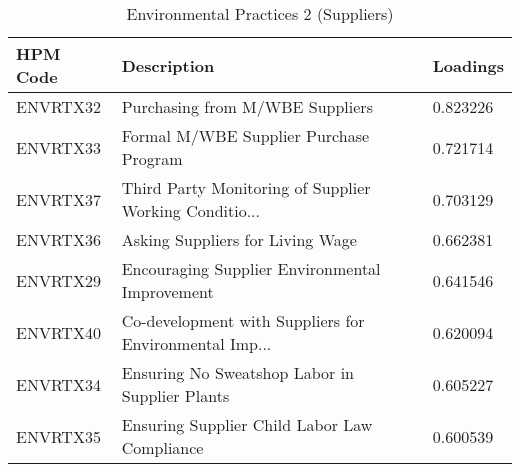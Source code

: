 \begin{table}[htbp]
\centering
\caption{Environmental Practices 2 (Suppliers)}
\label{tab:your_label}
\begin{tabular}{lll}
\toprule
HPM Code & Description & Loadings \\
\midrule
ENVRTX32 & Purchasing from M/WBE Suppliers & 0.823226 \\
ENVRTX33 & Formal M/WBE Supplier Purchase Program & 0.721714 \\
ENVRTX37 & Third Party Monitoring of Supplier Working Conditio... & 0.703129 \\
ENVRTX36 & Asking Suppliers for Living Wage & 0.662381 \\
ENVRTX29 & Encouraging Supplier Environmental Improvement & 0.641546 \\
ENVRTX40 & Co-development with Suppliers for Environmental Imp... & 0.620094 \\
ENVRTX34 & Ensuring No Sweatshop Labor in Supplier Plants & 0.605227 \\
ENVRTX35 & Ensuring Supplier Child Labor Law Compliance & 0.600539 \\
\bottomrule
\end{tabular}
\end{table}
